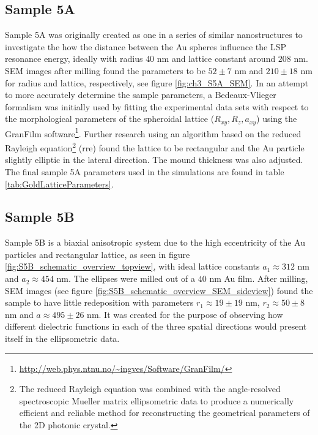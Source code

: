 \subsection{Sample 5A}
Sample 5A was originally created as one in a series of similar nanostructures to investigate the how the distance between the Au spheres influence the LSP resonance energy, ideally with radius $40$ nm and lattice constant around $208$ nm\cite{brakstad_thesis}. SEM images after milling found the parameters to be $52\pm7$ nm and $210\pm18$ nm for radius and lattice, respectively\cite{brakstad_thesis}, see figure \ref{fig:ch3_S5A_SEM}. In an attempt to more accurately determine the sample parameters, a Bedeaux-Vlieger formalism\cite{BV} was initially used by fitting the experimental data sets with respect to the morphological parameters of the spheroidal lattice ($R_{xy}, R_z, a_{xy}$) using the GranFilm software\footnote{\url{http://web.phys.ntnu.no/~ingves/Software/GranFilm/}}\cite{Kildemo2017}\cite{Brakstad:15}. Further research \cite{JP_RRE} using an algorithm based on the reduced Rayleigh equation\footnote{The reduced Rayleigh equation was combined with the angle-resolved spectroscopic Mueller matrix ellipsometric data to produce a numerically efficient and reliable method for reconstructing the geometrical parameters of the 2D photonic crystal\cite{JP_RRE}.} (\ac{rre})\cite{simonsen_RRE} found the lattice to be rectangular and the Au particle slightly elliptic in the lateral direction. The mound thickness was also adjusted\cite{JP_RRE}. The final sample 5A parameters used in the simulations are found in table \ref{tab:GoldLatticeParameters}. 

\subsection{Sample 5B}
\label{sec:ch3_sample5B}
Sample 5B is a biaxial anisotropic system due to the high eccentricity of the Au particles and rectangular lattice, as seen in figure \ref{fig:S5B_schematic_overview_topview}, with ideal lattice constants $a_1\approx312$ nm and $a_2\approx454$ nm. The ellipses were milled out of a $40$ nm Au film. After milling, SEM images (see figure \ref{fig:S5B_schematic_overview_SEM_sideview}) found the sample to have little redeposition with parameters $r_1\approx19\pm19$ nm, $r_2\approx50\pm8$ nm and $a\approx495\pm26$ nm\cite{brakstad_thesis}. It was created for the purpose of observing how different dielectric functions in each of the three spatial directions would present itself in the ellipsometric data. 

